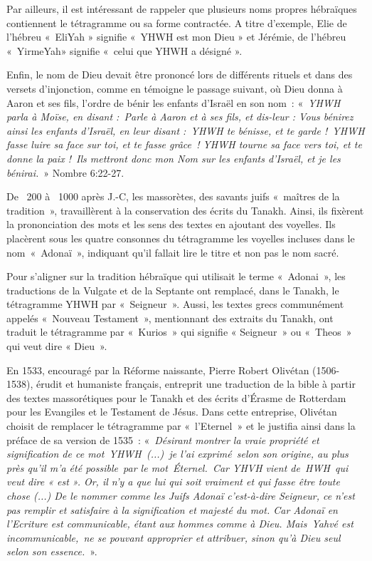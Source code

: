 \begin{small}
Par ailleurs, il est intéressant de rappeler que plusieurs noms propres hébraïques contiennent le tétragramme ou sa forme contractée. A titre d'exemple, Elie de l'hébreu « EliYah » signifie « YHWH est mon Dieu » et Jérémie, de l'hébreu « YirmeYah» signifie « celui que YHWH a désigné ».\bigskip

Enfin, le nom de Dieu devait être prononcé lors de différents rituels et dans des versets d'injonction, comme en témoigne le passage suivant, où Dieu donna à Aaron et ses fils, l'ordre de bénir les enfants d'Israël en son nom : « \emph{YHWH parla à Moïse, en disant : Parle à Aaron et à ses fils, et dis-leur : Vous bénirez ainsi les enfants d'Israël, en leur disant : YHWH te bénisse, et te garde ! YHWH fasse luire sa face sur toi, et te fasse grâce ! YHWH tourne sa face vers toi, et te donne la paix ! Ils mettront donc mon Nom sur les enfants d'Israël, et je les bénirai.} » Nombre 6:22-27.\bigskip

De ~200 à ~1000 après J.-C, les massorètes, des savants juifs « maîtres de la tradition », travaillèrent à la conservation des écrits du Tanakh. Ainsi, ils  fixèrent la prononciation des mots et les sens des textes en ajoutant des voyelles. Ils placèrent sous les quatre consonnes du tétragramme les voyelles incluses dans le nom « Adonaï », indiquant qu'il fallait lire le titre et non pas le nom sacré.\bigskip

Pour s'aligner sur la tradition hébraïque qui utilisait le terme « Adonai », les traductions de la Vulgate et de la Septante ont remplacé, dans le Tanakh, le tétragramme YHWH par « Seigneur ». Aussi, les textes grecs communément appelés « Nouveau Testament », mentionnant des extraits du Tanakh, ont traduit le tétragramme par « Kurios » qui signifie « Seigneur » ou « Theos » qui veut dire « Dieu ».\bigskip

En 1533, encouragé par la Réforme naissante, Pierre Robert Olivétan (1506-1538), érudit et humaniste français, entreprit une traduction de la bible à partir des textes massorétiques pour le Tanakh et des écrits d'Érasme de Rotterdam pour les Evangiles et le Testament de Jésus. Dans cette entreprise, Olivétan choisit de remplacer le tétragramme par « l'Eternel » et le justifia ainsi dans la préface de sa version de 1535 :\newline
« \emph{Désirant montrer la vraie propriété et signification de ce mot \emph{YHWH (...) je l'ai exprimé} selon son origine, au plus près qu'il m'a été possible \emph{par le mot Éternel}. Car YHVH vient de \emph{HWH} qui veut dire « est ». Or, il n'y a que lui qui soit vraiment et qui fasse être toute chose (...) De le nommer comme les Juifs Adonaï c'est-à-dire Seigneur, ce n'est pas remplir et satisfaire à la signification et majesté du mot. Car Adonaï en l'Ecriture est communicable, étant aux hommes comme à Dieu. Mais \emph{Yahvé} est incommunicable, ne se pouvant approprier et attribuer, sinon qu'à Dieu seul selon son essence.} ».\bigskip


\end{small}
